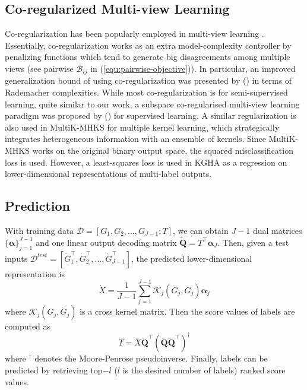 \documentclass[a4paper]{article}
\begin{document}
\subsection{Co-regularized Multi-view Learning}
Co-regularization has been popularly employed in multi-view learning \citep{Farquhar_2005_NIPS,Brefeld_2006_ICML,Rosenberg_2007_AISTATS}. Essentially, co-regularization 
works as an extra model-complexity controller by penalizing functions which tend to generate big disagreements among multiple views (see pairwise $\mathcal{B}_{ij}$ in (\ref{equ:pairwise-objective})).   
In particular, an improved generalization bound of using co-regularization was presented by \citeauthor{Rosenberg_2007_AISTATS} (\citeyear{Rosenberg_2007_AISTATS}) in terms of Rademacher complexities.    
While most co-regularization is for semi-supervised learning, quite similar to our work,  a subspace co-regularised multi-view learning paradigm was proposed by \citeauthor{Guo_2012_ICML} (\citeyear{Guo_2012_ICML})
for supervised learning.
A similar regularization is also used in MultiK-MHKS \citep{MKL} for multiple kernel learning, which strategically integrates heterogeneous information with an 
ensemble of kernels. Since MultiK-MHKS works on the original binary output space, the squared misclassification loss is used. However, a least-squares loss is 
used in KGHA as a regression on lower-dimensional representations of multi-label outputs.      

\subsection{Prediction}
With training data $\mathcal{D}=[G_1,G_2,\ldots, G_{J-1}; T]$, we can obtain $J-1$ dual matrices $\{\boldsymbol{\alpha}\}_{j=1}^{J-1}$ and one linear 
output decoding matrix $\tilde{\mathbf{Q}}=T^\top \boldsymbol{\alpha}_J$.  
Then, given a test inputs $\mathcal{D}^{test}=[\dot{G}_1^\top,\dot{G}_2^\top,\ldots, \dot{G}_{J-1}^\top]$, the predicted lower-dimensional representation is
\begin{equation}
    \dot{X}=\frac{1}{J-1}\sum_{j=1}^{J-1} \mathcal{K}_j(\dot{G}_j, G_j)\boldsymbol{\alpha}_j  
\end{equation}
where $\mathcal{K}_j(G_j, \dot{G}_j )$ is a cross kernel matrix.  Then the score values of labels are computed as 
\begin{equation}
    \dot{T}=\dot{X}\tilde{\mathbf{Q}}^\top (\tilde{\mathbf{Q}}\tilde{\mathbf{Q}}^\top)^\dagger
    \label{equ:binary_prediction}
\end{equation}
where $^\dagger$ denotes the Moore-Penrose pseudoinverse. Finally, labels can be predicted by retrieving top$-l$ ($l$ is the desired number of labels) ranked score values. 
\end{document}
